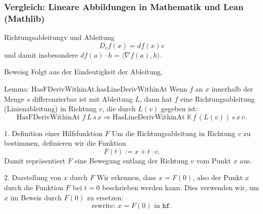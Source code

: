 \documentclass{beamer}
\begin{document}
    \begin{frame}
        \frametitle{Vergleich: Lineare Abbildungen in Mathematik und Lean (Mathlib)}
        
        
        \begin{block}{Richtungsableitungv und Ableitung}
            \[
                D_v f (x) = df(x) v
            \]
            und damit insbesondere  $df(a) \cdot h = \langle \nabla f (a) , h \rangle$.
        \end{block}

        \begin{block}{Beweisg}
            Folgt aus der Eindeutigkeit der Ableitung.
        \end{block}
    \end{frame}


 
    


    \begin{frame}
        \begin{block}{Lemma: HasFDerivWithinAt.hasLineDerivWithinAt}
            Wenn \( f \) an \( x \) innerhalb der Menge \( s \) differenzierbar ist mit Ableitung \( L \), dann hat \( f \) eine Richtungsableitung (Linienableitung) in Richtung \( v \), die durch \( L(v) \) gegeben ist:
            \[
            \text{HasFDerivWithinAt } f \, L \, s \, x \Rightarrow \text{HasLineDerivWithinAt } \mathbb{K} \, f \, (L(v)) \, s \, x \, v.
            \]
        \end{block}
    \end{frame}
    
    \begin{frame}
        \begin{block}{1. Definition einer Hilfsfunktion \( F \)}
            Um die Richtungsableitung in Richtung \( v \) zu bestimmen, definieren wir die Funktion
            \[
            F(t) := x + t \cdot v.
            \]
            Damit repräsentiert \( F \) eine Bewegung entlang der Richtung \( v \) vom Punkt \( x \) aus.
        \end{block}
    
        \begin{block}{2. Darstellung von \( x \) durch \( F \)}
            Wir erkennen, dass \( x = F(0) \), also der Punkt \( x \) durch die Funktion \( F \) bei \( t = 0 \) beschrieben werden kann. Dies verwenden wir, um \( x \) im Beweis durch \( F(0) \) zu ersetzen:
            \[
            \text{rewrite: } x = F(0) \text{ in } \texttt{hf}.
            \]
        \end{block}
    \end{frame}
    
\end{document}
